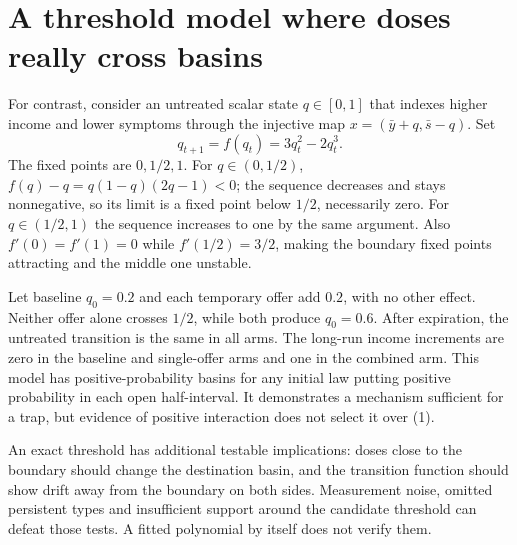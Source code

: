 \documentclass[11pt,a4paper]{article}
\begin{document}
\section{A threshold model where doses really cross basins}
For contrast, consider an untreated scalar state $q\in[0,1]$ that indexes higher income and lower symptoms through the injective map $x=(\bar y+q,\bar s-q)$. Set
\[
 q_{t+1}=f(q_t)=3q_t^2-2q_t^3.
\tag{2}
\]
The fixed points are $0,1/2,1$. For $q\in(0,1/2)$,
$f(q)-q=q(1-q)(2q-1)<0$; the sequence decreases and stays nonnegative, so its limit is a fixed point below $1/2$, necessarily zero. For $q\in(1/2,1)$ the sequence increases to one by the same argument. Also $f'(0)=f'(1)=0$ while $f'(1/2)=3/2$, making the boundary fixed points attracting and the middle one unstable.

Let baseline $q_0=0.2$ and each temporary offer add $0.2$, with no other effect. Neither offer alone crosses $1/2$, while both produce $q_0=0.6$. After expiration, the untreated transition is the same in all arms. The long-run income increments are zero in the baseline and single-offer arms and one in the combined arm. This model has positive-probability basins for any initial law putting positive probability in each open half-interval. It demonstrates a mechanism sufficient for a trap, but evidence of positive interaction does not select it over (1).

An exact threshold has additional testable implications: doses close to the boundary should change the destination basin, and the transition function should show drift away from the boundary on both sides. Measurement noise, omitted persistent types and insufficient support around the candidate threshold can defeat those tests. A fitted polynomial by itself does not verify them.
\end{document}
